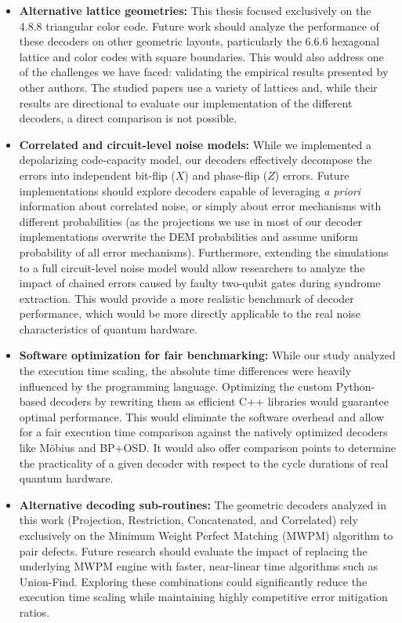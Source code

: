 \begin{itemize}
    \item \textbf{Alternative lattice geometries:} This thesis focused exclusively on the 4.8.8 triangular color code. Future work should analyze the performance of these decoders on other geometric layouts, particularly the 6.6.6 hexagonal lattice and color codes with square boundaries. This would also address one of the challenges we have faced: validating the empirical results presented by other authors. The studied papers use a variety of lattices and, while their results are directional to evaluate our implementation of the different decoders, a direct comparison is not possible. 
    
    \item \textbf{Correlated and circuit-level noise models:} While we implemented a depolarizing code-capacity model, our decoders effectively decompose the errors into independent bit-flip ($X$) and phase-flip ($Z$) errors. Future implementations should explore decoders capable of leveraging \textit{a priori} information about correlated noise, or simply about error mechanisms with different probabilities (as the projections we use in most of our decoder implementations overwrite the DEM probabilities and assume uniform probability of all error mechanisms). Furthermore, extending the simulations to a full circuit-level noise model would allow researchers to analyze the impact of chained errors caused by faulty two-qubit gates during syndrome extraction. This would provide a more realistic benchmark of decoder performance, which would be more directly applicable to the real noise characteristics of quantum hardware.
    
    \item \textbf{Software optimization for fair benchmarking:} While our study analyzed the execution time scaling, the absolute time differences were heavily influenced by the programming language. Optimizing the custom Python-based decoders by rewriting them as efficient C++ libraries would guarantee optimal performance. This would eliminate the software overhead and allow for a fair execution time comparison against the natively optimized decoders like Möbius and BP+OSD. It would also offer comparison points to determine the practicality of a given decoder with respect to the cycle durations of real quantum hardware.
    
    \item \textbf{Alternative decoding sub-routines:} The geometric decoders analyzed in this work (Projection, Restriction, Concatenated, and Correlated) rely exclusively on the Minimum Weight Perfect Matching (MWPM) algorithm to pair defects. Future research should evaluate the impact of replacing the underlying MWPM engine with faster, near-linear time algorithms such as Union-Find. Exploring these combinations could significantly reduce the execution time scaling while maintaining highly competitive error mitigation ratios.


\end{itemize}
